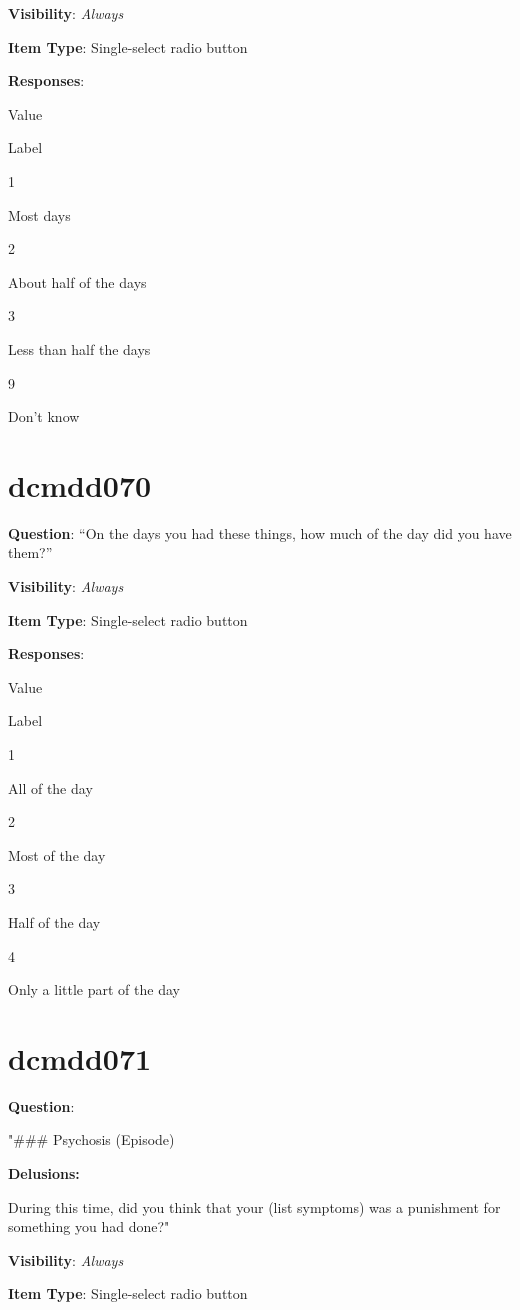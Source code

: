 \documentclass[
]{book}
\begin{document}
\textbf{Visibility}: \emph{Always}

\textbf{Item Type}: Single-select radio button

\textbf{Responses}:

Value

Label

1

Most days

2

About half of the days

3

Less than half the days

9

Don't know

\hypertarget{dcmdd070}{%
\section{dcmdd070}\label{dcmdd070}}

\textbf{Question}: ``On the days you had these things, how much of the day did you have them?''

\textbf{Visibility}: \emph{Always}

\textbf{Item Type}: Single-select radio button

\textbf{Responses}:

Value

Label

1

All of the day

2

Most of the day

3

Half of the day

4

Only a little part of the day

\hypertarget{dcmdd071}{%
\section{dcmdd071}\label{dcmdd071}}

\textbf{Question}:

"\#\#\# Psychosis (Episode)

\textbf{Delusions:}

During this time, did you think that your (list symptoms) was a punishment for something you had done?"

\textbf{Visibility}: \emph{Always}

\textbf{Item Type}: Single-select radio button
\end{document}
